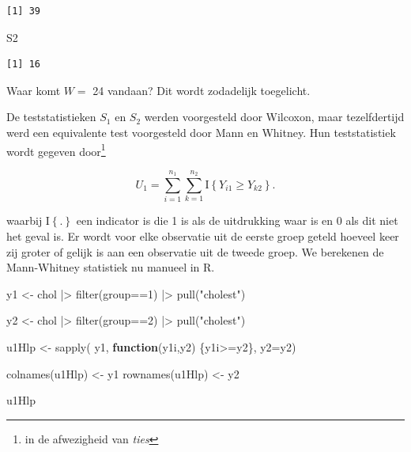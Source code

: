 \documentclass[
  dutch,
  letterpaper,
  12pt]{book}
\newenvironment{Shaded}{\begin{snugshade}}{\end{snugshade}}
\newcommand{\AttributeTok}[1]{\textcolor[rgb]{0.40,0.45,0.13}{#1}}
\newcommand{\ControlFlowTok}[1]{\textcolor[rgb]{0.00,0.23,0.31}{\textbf{#1}}}
\newcommand{\DecValTok}[1]{\textcolor[rgb]{0.68,0.00,0.00}{#1}}
\newcommand{\FunctionTok}[1]{\textcolor[rgb]{0.28,0.35,0.67}{#1}}
\newcommand{\NormalTok}[1]{\textcolor[rgb]{0.00,0.23,0.31}{#1}}
\newcommand{\OtherTok}[1]{\textcolor[rgb]{0.00,0.23,0.31}{#1}}
\newcommand{\SpecialCharTok}[1]{\textcolor[rgb]{0.37,0.37,0.37}{#1}}
\newcommand{\StringTok}[1]{\textcolor[rgb]{0.13,0.47,0.30}{#1}}
\theoremstyle{definition}
\theoremstyle{definition}
\theoremstyle{definition}
\theoremstyle{remark}
\begin{document}
\begin{verbatim}
[1] 39
\end{verbatim}

\begin{Shaded}
\begin{Highlighting}[]
\NormalTok{S2}
\end{Highlighting}
\end{Shaded}

\begin{verbatim}
[1] 16
\end{verbatim}

Waar komt \(W=\) 24 vandaan? Dit wordt zodadelijk toegelicht.

De teststatistieken \(S_1\) en \(S_2\) werden voorgesteld door Wilcoxon,
maar tezelfdertijd werd een equivalente test voorgesteld door Mann en
Whitney. Hun teststatistiek wordt gegeven door\footnote{in de
  afwezigheid van \emph{ties}}

\[U_1 = \sum_{i=1}^{n_1}\sum_{k=1}^{n_2} \text{I}\left\{Y_{i1}\geq Y_{k2}\right\}.\]

waarbij \(\text{I}\left\{.\right\}\) een indicator is die 1 is als de
uitdrukking waar is en 0 als dit niet het geval is. Er wordt voor elke
observatie uit de eerste groep geteld hoeveel keer zij groter of gelijk
is aan een observatie uit de tweede groep. We berekenen de Mann-Whitney
statistiek nu manueel in R.

\begin{Shaded}
\begin{Highlighting}[]
\NormalTok{y1 }\OtherTok{\textless{}{-}}\NormalTok{ chol }\SpecialCharTok{|\textgreater{}}
  \FunctionTok{filter}\NormalTok{(group}\SpecialCharTok{==}\DecValTok{1}\NormalTok{) }\SpecialCharTok{|\textgreater{}}
  \FunctionTok{pull}\NormalTok{(}\StringTok{"cholest"}\NormalTok{)}

\NormalTok{y2 }\OtherTok{\textless{}{-}}\NormalTok{ chol }\SpecialCharTok{|\textgreater{}}
  \FunctionTok{filter}\NormalTok{(group}\SpecialCharTok{==}\DecValTok{2}\NormalTok{) }\SpecialCharTok{|\textgreater{}}
  \FunctionTok{pull}\NormalTok{(}\StringTok{"cholest"}\NormalTok{)}

\NormalTok{u1Hlp }\OtherTok{\textless{}{-}} \FunctionTok{sapply}\NormalTok{(}
\NormalTok{  y1,}
  \ControlFlowTok{function}\NormalTok{(y1i,y2) \{y1i}\SpecialCharTok{\textgreater{}=}\NormalTok{y2\},}
  \AttributeTok{y2=}\NormalTok{y2)}

\FunctionTok{colnames}\NormalTok{(u1Hlp) }\OtherTok{\textless{}{-}}\NormalTok{ y1}
\FunctionTok{rownames}\NormalTok{(u1Hlp) }\OtherTok{\textless{}{-}}\NormalTok{ y2}

\NormalTok{u1Hlp}
\end{Highlighting}
\end{Shaded}
\end{document}

